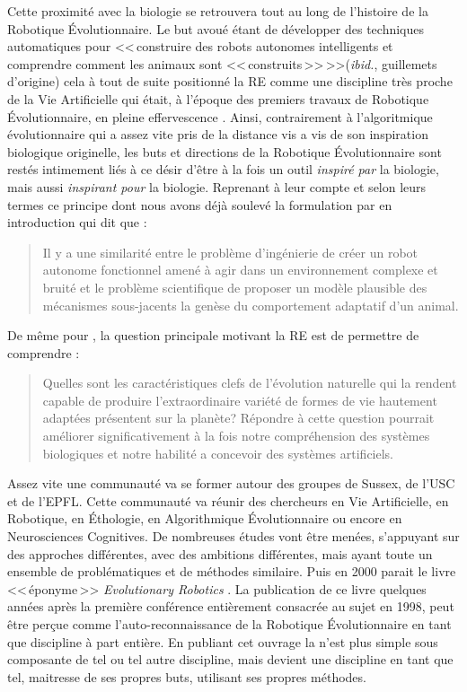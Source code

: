 Cette proximité avec la biologie se retrouvera tout au long de l'histoire de la Robotique \'Evolutionnaire. Le but avoué étant de développer des techniques automatiques pour <<\,construire des robots autonomes intelligents et comprendre comment les animaux sont <<\,construits\,>>\,>>(\emph{ibid.}, guillemets d'origine) cela à tout de suite positionné la RE comme une discipline très proche de la Vie Artificielle qui était, à l'époque des premiers travaux de Robotique \'Evolutionnaire, en pleine effervescence \citep{langton89alifeiproceedingsfirstinternationalworkshopsynthesissimulationlivingsystems}. Ainsi, contrairement à l'algoritmique évolutionnaire qui a assez vite pris de la distance vis a vis de son inspiration biologique originelle, les buts et directions de la Robotique \'Evolutionnaire sont restés intimement liés à ce désir d'être à la fois un outil \emph{inspiré par} la biologie, mais aussi \emph{inspirant pour} la biologie. Reprenant à leur compte et selon leurs termes ce principe dont nous avons déjà soulevé la formulation par \cite{maynardsmith78optimizationtheoryinevolution} en introduction qui dit que :
\begin{quotation}
	Il y a une similarité entre le problème d'ingénierie de créer un robot autonome fonctionnel amené à agir dans un environnement complexe et bruité et le problème scientifique de proposer un modèle plausible des mécanismes sous-jacents la genèse du comportement adaptatif d'un animal.\\
	\citep[p. 74]{cliff93explorationsinevolutionaryrobotics}
\end{quotation} 
De même pour \citet[p. 12-13]{nolfi00evolrobobiolintetechselfmach}, la question principale motivant la RE est de permettre de comprendre :
\begin{quotation}
	Quelles sont les caractéristiques clefs de l'évolution naturelle qui la rendent capable de produire l'extraordinaire variété de formes de vie hautement adaptées présentent sur la planète? Répondre à cette question pourrait améliorer significativement à la fois notre compréhension des systèmes biologiques et notre habilité a concevoir des systèmes artificiels.
\end{quotation}

Assez vite une communauté va se former autour des groupes de Sussex, de l'USC et de l'EPFL. Cette communauté va réunir des chercheurs en Vie Artificielle, en Robotique, en \'Ethologie, en Algorithmique \'Evolutionnaire ou encore en Neurosciences Cognitives. De nombreuses études vont être menées, s'appuyant sur des approches différentes, avec des ambitions différentes, mais ayant toute un ensemble de problématiques et de méthodes similaire. Puis en 2000 parait le livre <<\,éponyme\,>> \emph{Evolutionary Robotics} \citep{nolfi00evolrobobiolintetechselfmach}. La publication de ce livre quelques années après la première conférence entièrement consacrée au sujet en 1998, peut être perçue comme l'auto-reconnaissance de la Robotique \'Evolutionnaire en tant que discipline à part entière. En publiant cet ouvrage la n'est plus simple sous composante de tel ou tel autre discipline, mais devient une discipline en tant que tel, maitresse de ses propres buts, utilisant ses propres méthodes.


